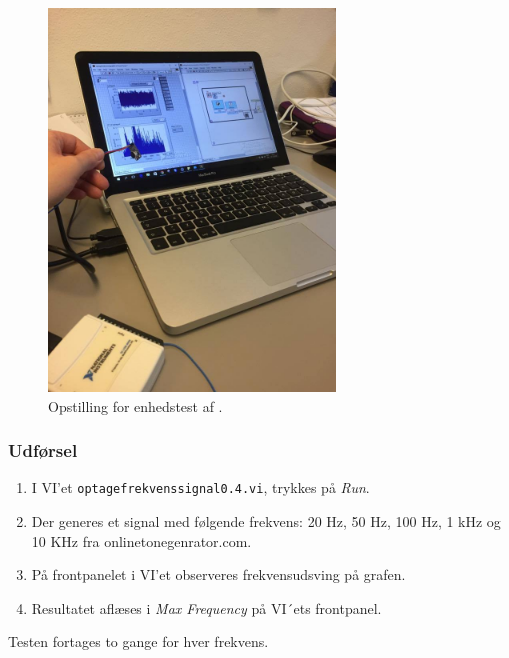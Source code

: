 		\begin{figure}
			\centering
			\includegraphics[width=3in]{elektrettoop.jpg}
			\caption{Opstilling for enhedstest af \elektretto.}
			\label{fig:elektrettoop}
		\end{figure}
	
		\subsubsection{Udførsel}
			\begin{enumerate}
				\item I VI'et \texttt{optagefrekvenssignal0.4.vi}, trykkes på \textit{Run}.  
				\item Der generes et signal med følgende frekvens: 20 Hz, 50 Hz, 100 Hz, 1 kHz og 10 KHz fra onlinetonegenrator.com.
				\item På frontpanelet i VI'et observeres frekvensudsving på grafen.   
				\item Resultatet aflæses i \textit{Max Frequency} på VI´ets frontpanel.
			\end{enumerate}
			
			Testen fortages to gange for hver frekvens.  
		
